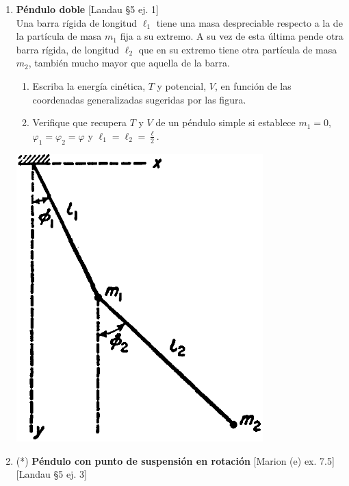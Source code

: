 \documentclass[11pt, a4paper, twoside]{article}
\begin{document}
\begin{enumerate}
\item
	\begin{minipage}[t][4cm]{0.7\textwidth}
		\textbf{Péndulo doble} [Landau \S5 ej. 1]\\
		Una barra rígida de longitud \(\ell_1\) tiene una masa despreciable respecto a la de la partícula de masa \(m_1\) fija a su extremo.
		A su vez de esta última pende otra barra rígida, de longitud \(\ell_2\) que en su extremo tiene otra partícula de masa \(m_2\), también mucho mayor que aquella de la barra.
		\begin{enumerate}
			\item Escriba la energía cinética, \(T\) y potencial, \(V\), en función de las coordenadas generalizadas sugeridas por las figura.
			\item Verifique que recupera \(T\) y \(V\) de un péndulo simple si establece \(m_1=0\), \(\varphi_1 = \varphi_2 = \varphi\) y \(\ell_1 = \ell_2 = \frac{\ell}{2}\).
		\end{enumerate}
	\end{minipage}
	\begin{minipage}[c][0.5cm][t]{0.3\textwidth}
		\includegraphics[width=0.75\textwidth]{figures/landauS52_fig1.png}
	\end{minipage}



\item
	\begin{minipage}[t][7.1cm]{0.5\textwidth}
		(*) \textbf{Péndulo con punto de suspensión en rotación} [Marion (e) ex. 7.5] [Landau \S5 ej. 3]\\


\end{minipage}
\end{enumerate}
\end{document}
